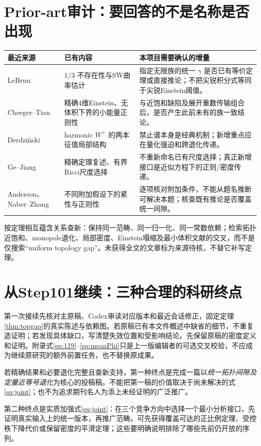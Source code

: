 \documentclass[UTF8,a4paper,11pt,fontset=fandol]{ctexart}
\numberwithin{equation}{section}
\theoremstyle{definition}
\begin{document}
\section{Prior-art审计：要回答的不是名称是否出现}
\begin{longtable}{L{.23\textwidth}L{.33\textwidth}L{.35\textwidth}}
\toprule 最近来源 & 已有内容 & 本项目需要确认的增量\\\midrule\endhead
LeBrun\cite{LeBrun2001} & $1/3$ 不存在性与SW曲率估计 & 指定无限族的统一 $\gamma$ 是否已有等价定理或直接推论；不把尖锐积分式等同于尖锐Einstein阈值。\\
Cheeger--Tian\cite{CT2006} & 精确4维Einstein、无体积下界的小能量正则性 & 与近饱和缺陷及展开重数传输组合后，是否产生此前未有的族一致结论。\\
Derdzi\'nski\cite{Derdzinski} & harmonic $W^+$ 的两本征值局部结构 & 禁止谱本身是经典机制；新增重点应在量化强迫和跨退化传递。\\
Ge--Jiang\cite{GJ2017} & 精确定理复述、有界Ricci尺度选择 & 不重新命名已有尺度选择；真正新增接口是近似方程下的正则/密度传递。\\
Anderson、Naber--Zhang\cite{Anderson1989,NZ} & 不同附加假设下的紧性与正则性 & 逐项核对附加条件，不能从题名推断可解决本题；核查既有推论是否覆盖统一间隙。\\\bottomrule
\end{longtable}
按定理相互蕴含关系查新：保持同一范畴、同一归一化、同一常数依赖；检索拓扑近饱和、monopole退化、局部密度、Einstein塌缩及最小体积文献的交叉，而不是仅搜索“uniform topology gap”。未获得全文的文章标为来源待核，不替它补写定理。

\section{从Step101继续：三种合理的科研终点}
第一次接续先核对主原稿、Codex审读对应版本和最近会话修正，固定定理\ref{thm:topgap}的真实陈述与依赖图。若原稿已有本文件概述中缺省的细节，不重复造证明；若发现具体缺口，写清楚失效位置和受影响结论。先保留原稿的密度定义和证明。附录式\eqref{eq:119}--\eqref{eq:meanPhi}只是上一版编辑者的可选交叉校验，不应成为继续原研究的额外前置任务，也不替换原成果。

若精确结果和必要退化完整且查新支持，第一种终点是完成一篇以\emph{统一拓扑间隙及定量近等号退化}为核心的投稿稿。不能把第一稿的价值取决于尚未解决的式\eqref{eq:joint}；也不为追求期刊名人为添上未经证明的广泛推广。

第二种终点是实质加强式\eqref{eq:joint}：在三个竞争方向中选择一个最小分析接口，先证明真实输入上的统一版本，再推广范畴。可先获得覆盖可达的正比例定理、受控秩下降代价或保留密度的平滑定理；这些要明确说明排除了哪些先前仍开放的序列。
\end{document}
